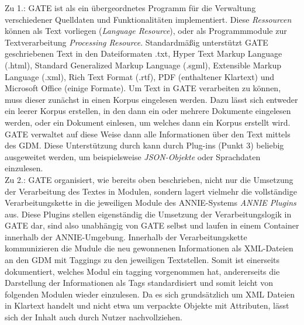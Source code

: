 \documentclass[12pt]{report}
\begin{document}
Zu 1.: GATE ist als ein übergeordnetes Programm für die Verwaltung verschiedener Quelldaten und Funktionalitäten implementiert. Diese \textit{Ressourcen} können als Text vorliegen (\textit{Language Resource}), oder als Programmmodule zur Textverarbeitung \textit{Processing Resource}. Standardmäßig unterstützt GATE geschriebenen Text in den Dateiformaten .txt, Hyper Text Markup Language (.html), Standard Generalized Markup Language (.sgml), Extensible Markup Language (.xml), Rich Text Format (.rtf), PDF (enthaltener Klartext) und Microsoft Office (einige Formate). Um Text in GATE verarbeiten zu können, muss dieser zunächst in einen Korpus eingelesen werden. Dazu lässt sich entweder ein leerer Korpus erstellen, in den dann ein oder mehrere Dokumente eingelesen werden, oder ein Dokument einlesen, um welches dann ein Korpus erstellt wird. GATE verwaltet auf diese Weise dann alle Informationen über den Text mittels des GDM. Diese Unterstützung durch kann durch Plug-ins (Punkt 3) beliebig ausgeweitet werden, um beispielsweise \textit{JSON-Objekte} oder Sprachdaten einzulesen.\\

Zu 2.: GATE organisiert, wie bereits oben beschrieben, nicht nur die Umsetzung der Verarbeitung des Textes in Modulen, sondern lagert vielmehr die vollständige Verarbeitungskette in die jeweiligen Module des ANNIE-Systems \textit{ANNIE Plugins} aus. Diese Plugins stellen eigenständig die Umsetzung der Verarbeitungslogik in GATE dar, sind also unabhängig von GATE selbst und laufen in einem Container innerhalb der ANNIE-Umgebung. Innerhalb der Verarbeitungskette kommunizieren die Mudule die neu gewonnenen Informationen als XML-Dateien an den GDM mit Taggings zu den jeweiligen Textstellen. Somit ist einerseits dokumentiert, welches Modul ein tagging vorgenommen hat,  andererseits die Darstellung der Informationen als Tags standardisiert und somit leicht von folgenden Modulen wieder einzulesen. Da es sich grundsätzlich um XML Dateien in Klartext handelt und nicht etwa um verpackte Objekte mit Attributen, lässt sich der Inhalt auch durch Nutzer nachvollziehen.\\
\end{document}
